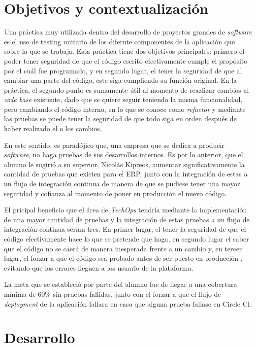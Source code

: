 \section{Objetivos y contextualización}

  Una práctica muy utilizada dentro del desarrollo de proyectos grandes de \textit{software} es el uso de testing unitario de los difernte componentes de la aplicación que sobre la que se trabaja. Esta práctica tiene dos objetivos principales: primero el poder tener seguridad de que el código escrito efectivamente cumple el propósito por el cuál fue programado, y en segundo lugar, el tener la seguridad de que al cambiar una parte del código, este siga cumpliendo su función original. En la práctica, el segundo punto es sumamente útil al momento de reazlizar cambios al \textit{code base} existente, dado que se quiere seguir teniendo la misma funcionalidad, pero cambiando el código interno, en lo que se conoce como \textit{refactor} y mediante las pruebas se puede tener la seguridad de que todo siga en orden después de haber realizado el o los cambios. 
  
  En este sentido, es paradójico que, una empresa que se dedica a producir \textit{software}, no haga pruebas de sus desarrollos internos. Es por lo anterior, que el alumno le sugirió a su superior, Nicolás Kipreos, aumentar significativamente la cantidad de pruebas que existen para el ERP, junto con la integración de estas a un flujo de integración continua de manera de que se pudiese tener una mayor seguridad y cofianza al momento de poner en producción el nuevo código.

  El pricipal beneficio que el área de \textit{TechOps} tendría mediante la implementación de una mayor cantidad de pruebas y la integración de estas pruebas a un flujo de integración continua serían tres. En primer lugar, el tener la seguridad de que el código efectivamente hace lo que se pretende que haga, en segundo lugar el saber que el código no se caerá de manera inesperada frente a un cambio y, en tercer lugar, el forzar a que el código sea probado antes de ser puesto en producción \cite{ibm_testing}, evitando que los errores lleguen a los usuario de la plataforma.

  La meta que se estableció por parte del alumno fue de llegar a una cobertura mínima de 60\% sin pruebas fallidas, junto con el forzar a que el flujo de \textit{deployment} de la aplicación fallara en caso que alguna prueba fallase en Circle CI.

\section{Desarrollo}

